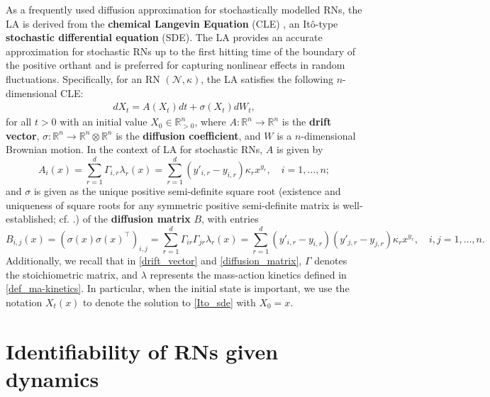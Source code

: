 \documentclass[10pt,a4paper]{amsart}
\theoremstyle{definition}
\theoremstyle{remark}
\theoremstyle{consequence}
\def\la{\lambda}
\def\la{\lambda}
\def\k{\kappa}
\def\cN{\mathcal{N}}
\def\R{\mathbb{R}}
\numberwithin{equation}{section}
\begin{document}
As a frequently used diffusion approximation for stochastically modelled RNs, the LA is derived from the \textbf{chemical Langevin Equation} (CLE) \cite{Gillespie_di}, an It\^{o}-type \textbf{stochastic differential equation} (SDE). The LA provides an accurate approximation for stochastic RNs up to the first hitting time of the boundary of the positive orthant and is preferred for capturing nonlinear effects in random fluctuations. Specifically, for an RN $(\cN, \k)$, the LA satisfies the following $n$-dimensional CLE:
\begin{align}\label{Ito_sde} 
  d X_t = A(X_t) dt + \sigma(X_t) dW_t,
\end{align}
for all $t > 0$ with an initial value $X_0 \in \R_{> 0}^n$, where $A \colon \R^n \to \R^n$ is the \textbf{drift vector}, $\sigma \colon \R^n \to \R^{n} \otimes \R^{n}$ is the \textbf{diffusion coefficient}, and $W$ is a $n$-dimensional Brownian motion. In the context of LA for stochastic RNs, $A$ is given by
\begin{equation}\label{drift_vector}
      A_i(x) = \sum_{r=1}^d \Gamma_{i,r}\la_r(x) = \sum_{r=1}^d (y'_{i,r} - y_{i,r}) \kappa_r x^{y_r}, \quad i = 1,\dots, n;
\end{equation}
and $\sigma$ is given as the unique positive semi-definite square root (existence and uniqueness of square roots for any symmetric positive semi-definite matrix is well-established; cf. \cite{bhatia97}.) of the \textbf{diffusion matrix} $B$, with entries
\begin{equation}\label{diffusion_matrix}
      B_{i,j}(x)=
(\sigma(x) \sigma(x)^{\intercal})_{i,j} = \sum_{r=1}^d \Gamma_{ir}\Gamma_{jr} \la_r(x) = \sum_{r = 1}^d (y'_{i,r} - y_{i,r}) (y'_{j,r} - y_{j,r}) \kappa_r x^{y_r}, \quad i, j = 1, \dots, n.
\end{equation}
Additionally, we recall that in \eqref{drift_vector} and \eqref{diffusion_matrix}, $\Gamma$ denotes the stoichiometric matrix, and $\lambda$ represents the mass-action kinetics defined in \eqref{def_ma-kinetics}. In particular, when the initial state is important, we use the notation $X_t(x)$ to denote the solution to \eqref{Ito_sde} with $X_0 = x$.






 
 


\section{Identifiability of RNs given dynamics}\label{ident_cons}
\end{document}

